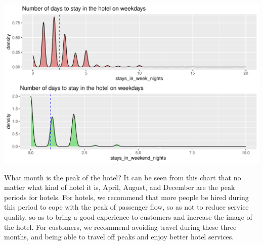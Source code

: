 \documentclass[11pt,a4paper,]{article}
\begin{document}
\includegraphics{tidy_files/figure-latex/unnamed-chunk-11-1.pdf}

What month is the peak of the hotel?
It can be seen from this chart that no matter what kind of hotel it is, April, August, and December are the peak periods for hotels.
For hotels, we recommend that more people be hired during this period to cope with the peak of passenger flow, so as not to reduce service quality, so as to bring a good experience to customers and increase the image of the hotel.
For customers, we recommend avoiding travel during these three months, and being able to travel off peaks and enjoy better hotel services.
\end{document}
